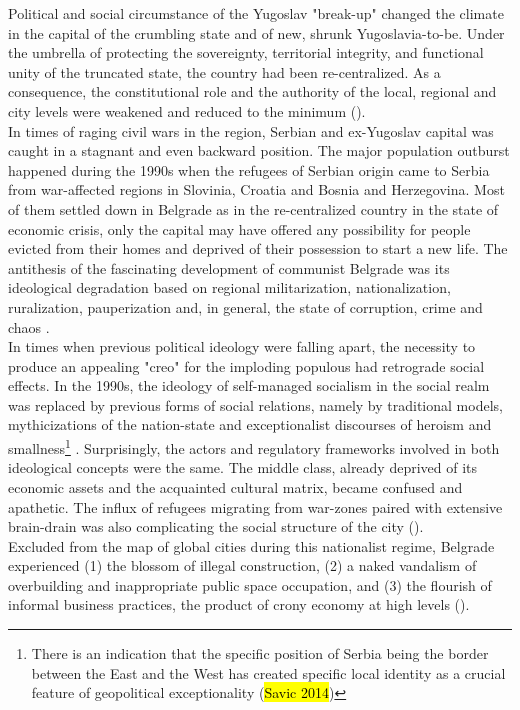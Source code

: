 \documentclass[11pt]{report}
\begin{document}
Political and social circumstance of the Yugoslav "break-up" changed the climate in the capital of the crumbling state and of new, shrunk Yugoslavia-to-be.
Under the umbrella of protecting the sovereignty, territorial integrity,  and functional unity of the truncated state, the country had been re-centralized.
As a consequence, the constitutional role and the authority of the local, regional and city levels were weakened and reduced to the minimum (\cite{Vujosevic 2015 Regionalizam u Srbiji 2}). 
\\
In times of raging civil wars in the region, Serbian and ex-Yugoslav capital was caught in a stagnant and even backward position.
The major population outburst happened during the 1990s when the refugees of Serbian origin came to Serbia from war-affected regions in Slovinia, Croatia and Bosnia and Herzegovina.
Most of them settled down in Belgrade as in the re-centralized country in the state of economic crisis, only the capital may have offered any possibility for people evicted from their homes and deprived of their possession to start a new life.
The antithesis of the fascinating development of communist Belgrade was its ideological  degradation  based  on regional militarization, nationalization, ruralization, pauperization and, in general, the state of corruption, crime and chaos \cite{ref}. 
\\
In times when previous political ideology were falling apart, the necessity to produce an appealing "creo" for the imploding populous had retrograde social effects.
In the 1990s, the ideology of self-managed socialism in the social realm was replaced by previous forms of social relations, namely by traditional models, mythicizations of the nation-state and exceptionalist discourses of heroism and smallness\footnote{There is an indication that the specific position of Serbia being the border between the East and the West has created specific local identity as a crucial feature of geopolitical exceptionality (\hl{Savic 2014})} \cite{(Savic 2014, Samardzic in Doytchinov 2015)}.
Surprisingly, the actors and regulatory frameworks involved in both ideological concepts were the same.
The middle class, already deprived of its economic assets and the acquainted cultural matrix, became confused and apathetic.
The influx of refugees migrating from war-zones paired with extensive brain-drain was also complicating the social structure of the city (\cite{Vanista Lazarevic in Doytchinov 2015}).
\\
Excluded from the map of global cities during this nationalist regime, Belgrade experienced (1) the blossom of illegal construction, (2) a naked vandalism of overbuilding and inappropriate public space occupation, and (3) the flourish of informal business practices, the product of crony economy at high levels (\cite{ref}).
\end{document}
